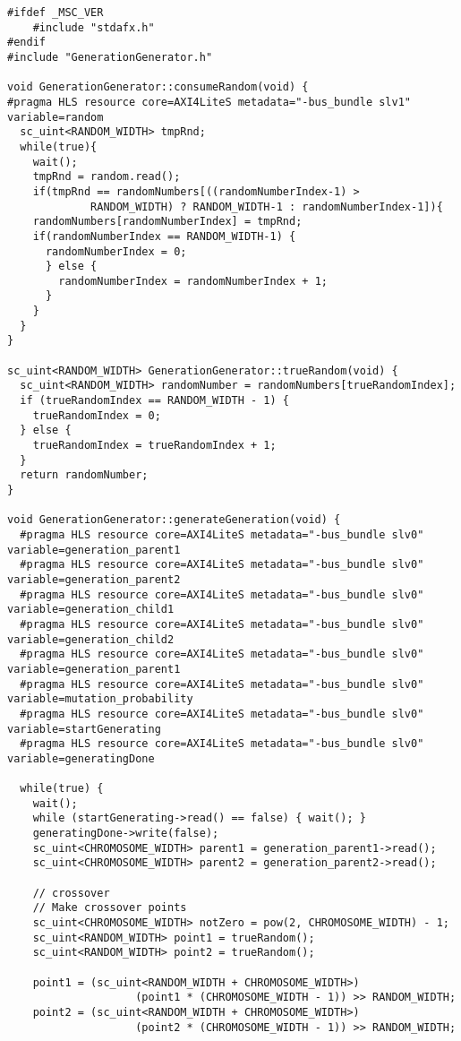 \begin{lstlisting}[style=customc++,caption={GenerationGenerator.cpp},label={lst:generationgenerator_cpp}]
#ifdef _MSC_VER
	#include "stdafx.h"
#endif
#include "GenerationGenerator.h"

void GenerationGenerator::consumeRandom(void) {
#pragma HLS resource core=AXI4LiteS metadata="-bus_bundle slv1" variable=random
  sc_uint<RANDOM_WIDTH> tmpRnd;
  while(true){
    wait();
    tmpRnd = random.read();
    if(tmpRnd == randomNumbers[((randomNumberIndex-1) > 
             RANDOM_WIDTH) ? RANDOM_WIDTH-1 : randomNumberIndex-1]){
    randomNumbers[randomNumberIndex] = tmpRnd;
    if(randomNumberIndex == RANDOM_WIDTH-1) {
      randomNumberIndex = 0;
      } else {
        randomNumberIndex = randomNumberIndex + 1;
      }
    }
  }
}

sc_uint<RANDOM_WIDTH> GenerationGenerator::trueRandom(void) {
  sc_uint<RANDOM_WIDTH> randomNumber = randomNumbers[trueRandomIndex];
  if (trueRandomIndex == RANDOM_WIDTH - 1) {
    trueRandomIndex = 0;
  } else {
    trueRandomIndex = trueRandomIndex + 1;
  }
  return randomNumber;
}

void GenerationGenerator::generateGeneration(void) {
  #pragma HLS resource core=AXI4LiteS metadata="-bus_bundle slv0" variable=generation_parent1
  #pragma HLS resource core=AXI4LiteS metadata="-bus_bundle slv0" variable=generation_parent2
  #pragma HLS resource core=AXI4LiteS metadata="-bus_bundle slv0" variable=generation_child1
  #pragma HLS resource core=AXI4LiteS metadata="-bus_bundle slv0" variable=generation_child2
  #pragma HLS resource core=AXI4LiteS metadata="-bus_bundle slv0" variable=generation_parent1
  #pragma HLS resource core=AXI4LiteS metadata="-bus_bundle slv0" variable=mutation_probability
  #pragma HLS resource core=AXI4LiteS metadata="-bus_bundle slv0" variable=startGenerating
  #pragma HLS resource core=AXI4LiteS metadata="-bus_bundle slv0" variable=generatingDone

  while(true) {
    wait();	
    while (startGenerating->read() == false) { wait(); }
    generatingDone->write(false);
    sc_uint<CHROMOSOME_WIDTH> parent1 = generation_parent1->read();
    sc_uint<CHROMOSOME_WIDTH> parent2 = generation_parent2->read();

    // crossover
    // Make crossover points
    sc_uint<CHROMOSOME_WIDTH> notZero = pow(2, CHROMOSOME_WIDTH) - 1;
    sc_uint<RANDOM_WIDTH> point1 = trueRandom();
    sc_uint<RANDOM_WIDTH> point2 = trueRandom();

    point1 = (sc_uint<RANDOM_WIDTH + CHROMOSOME_WIDTH>) 
                    (point1 * (CHROMOSOME_WIDTH - 1)) >> RANDOM_WIDTH;
    point2 = (sc_uint<RANDOM_WIDTH + CHROMOSOME_WIDTH>) 
                    (point2 * (CHROMOSOME_WIDTH - 1)) >> RANDOM_WIDTH;


\end{lstlisting}
